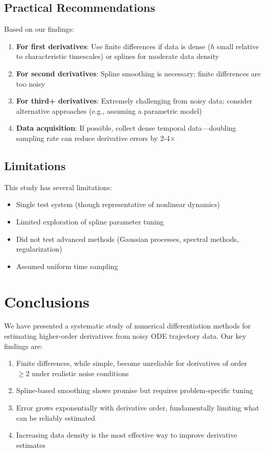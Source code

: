 \documentclass[11pt,a4paper]{article}
\begin{document}
\subsection{Practical Recommendations}

Based on our findings:
\begin{enumerate}
    \item \textbf{For first derivatives}: Use finite differences if data is dense ($h$ small relative to characteristic timescales) or splines for moderate data density
    \item \textbf{For second derivatives}: Spline smoothing is necessary; finite differences are too noisy
    \item \textbf{For third+ derivatives}: Extremely challenging from noisy data; consider alternative approaches (e.g., assuming a parametric model)
    \item \textbf{Data acquisition}: If possible, collect dense temporal data---doubling sampling rate can reduce derivative errors by 2-4$\times$
\end{enumerate}

\subsection{Limitations}

This study has several limitations:
\begin{itemize}
    \item Single test system (though representative of nonlinear dynamics)
    \item Limited exploration of spline parameter tuning
    \item Did not test advanced methods (Gaussian processes, spectral methods, regularization)
    \item Assumed uniform time sampling
\end{itemize}

\section{Conclusions}

We have presented a systematic study of numerical differentiation methods for estimating higher-order derivatives from noisy ODE trajectory data. Our key findings are:

\begin{enumerate}
    \item Finite differences, while simple, become unreliable for derivatives of order $\geq 2$ under realistic noise conditions
    \item Spline-based smoothing shows promise but requires problem-specific tuning
    \item Error grows exponentially with derivative order, fundamentally limiting what can be reliably estimated
    \item Increasing data density is the most effective way to improve derivative estimates
\end{enumerate}
\end{document}
